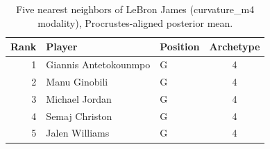 \begin{table}[htbp]
  \centering\small
  \begin{tabular}{rllc}
    \toprule
    Rank & Player & Position & Archetype \\
    \midrule
    1 & Giannis Antetokounmpo & G & 4 \\
    2 & Manu Ginobili & G & 4 \\
    3 & Michael Jordan & G & 4 \\
    4 & Semaj Christon & G & 4 \\
    5 & Jalen Williams & G & 4 \\
    \bottomrule
  \end{tabular}
  \caption{Five nearest neighbors of LeBron James (curvature_m4 modality), Procrustes-aligned posterior mean.}
  \label{tab:LeBron_James_neighbors_curvature_m4}
\end{table}

